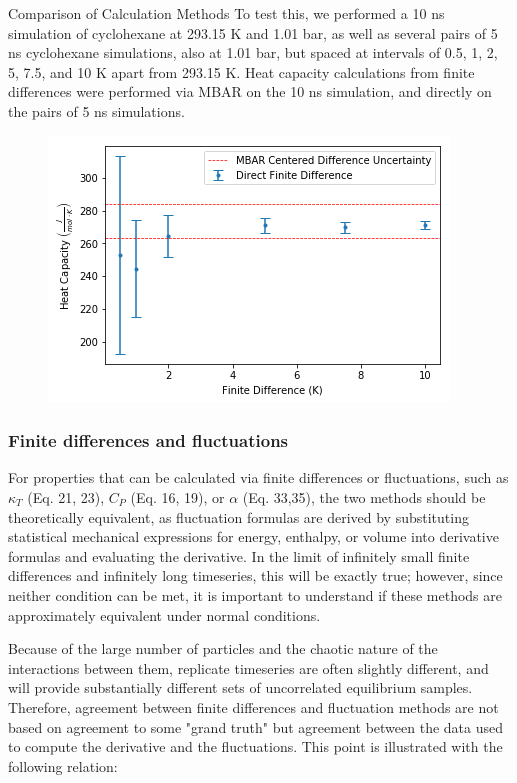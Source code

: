 \documentclass[aps,pre,twocolumn,nofootinbib,superscriptaddress,linenumbers,10pt, draft,tightenlines]{revtex4-1}
\begin{document}
\begin{subsection}{Comparison of Calculation Methods}
To test this, we performed a 10 ns simulation of cyclohexane at 293.15 K and 1.01 bar, as well as several pairs of 5 ns cyclohexane simulations, also at 1.01 bar, but spaced at intervals of 0.5, 1, 2, 5, 7.5, and 10 K apart from 293.15 K. Heat capacity calculations from finite differences were performed via MBAR on the 10 ns simulation, and directly on the pairs of 5 ns simulations. 
\begin{figure}[H]
\includegraphics[width=\textwidth]{figures/direct_sim_vs_mbar_cp.png}
\end{figure}

\subsubsection{Finite differences and fluctuations}

For properties that can be calculated via finite differences or fluctuations, such as $\kappa_T$ (Eq. 21, 23), $C_P$ (Eq. 16, 19), or $\alpha$ (Eq. 33,35), the two methods should be theoretically equivalent, as fluctuation formulas are derived by substituting statistical mechanical expressions for energy, enthalpy, or volume into derivative formulas and evaluating the derivative.  In the limit of infinitely small finite differences and infinitely long timeseries, this will be exactly true; however, since neither condition can be met, it is important to understand if these methods are approximately equivalent under normal conditions.

Because of the large number of particles and the chaotic nature of the interactions between them, replicate timeseries are often slightly different, and will provide substantially different sets of uncorrelated equilibrium samples.  Therefore, agreement between finite differences and fluctuation methods are not based on agreement to some "grand truth" but agreement between the data used to compute the derivative and the fluctuations. This point is illustrated with the following relation:


\end{subsection}
\end{document}

